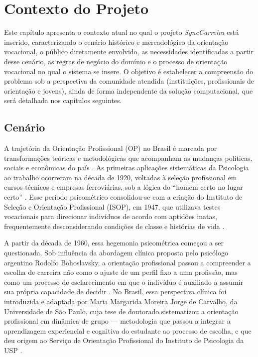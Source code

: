 \chapter{Contexto do Projeto}\label{cap:contexto}

Este capítulo apresenta o contexto atual no qual o projeto \textit{SyncCarreira} está inserido, caracterizando o cenário histórico e mercadológico da orientação vocacional, o público diretamente envolvido, as necessidades identificadas a partir desse cenário, as regras de negócio do domínio e o processo de orientação vocacional no qual o sistema se insere. O objetivo é estabelecer a compreensão do problema sob a perspectiva da comunidade atendida (instituições, profissionais de orientação e jovens), ainda de forma independente da solução computacional, que será detalhada nos capítulos seguintes.

\section{Cenário}\label{sec:cenario}

A trajetória da Orientação Profissional (OP) no Brasil é marcada por transformações teóricas e metodológicas que acompanham as mudanças políticas, sociais e econômicas do país \cite{abade2005}. As primeiras aplicações sistemáticas da Psicologia ao trabalho ocorreram na década de 1920, voltadas à seleção profissional em cursos técnicos e empresas ferroviárias, sob a lógica do ``homem certo no lugar certo'' \cite{abade2005}. Esse período psicométrico consolidou-se com a criação do Instituto de Seleção e Orientação Profissional (ISOP), em 1947, que utilizava testes vocacionais para direcionar indivíduos de acordo com aptidões inatas, frequentemente desconsiderando condições de classe e histórias de vida \cite{abade2005}.

A partir da década de 1960, essa hegemonia psicométrica começou a ser questionada. Sob influência da abordagem clínica proposta pelo psicólogo argentino Rodolfo Bohoslavsky, a orientação profissional passou a compreender a escolha de carreira não como o ajuste de um perfil fixo a uma profissão, mas como um processo de esclarecimento em que o indivíduo é auxiliado a assumir sua própria capacidade de decidir \cite{bohoslavsky2015}. No Brasil, essa perspectiva clínica foi introduzida e adaptada por Maria Margarida Moreira Jorge de Carvalho, da Universidade de São Paulo, cuja tese de doutorado sistematizou a orientação profissional em dinâmica de grupo --- metodologia que passou a integrar a aprendizagem experiencial e cognitiva do estudante ao processo de escolha, e que deu origem ao Serviço de Orientação Profissional do Instituto de Psicologia da USP \cite{carvalho1979}.

